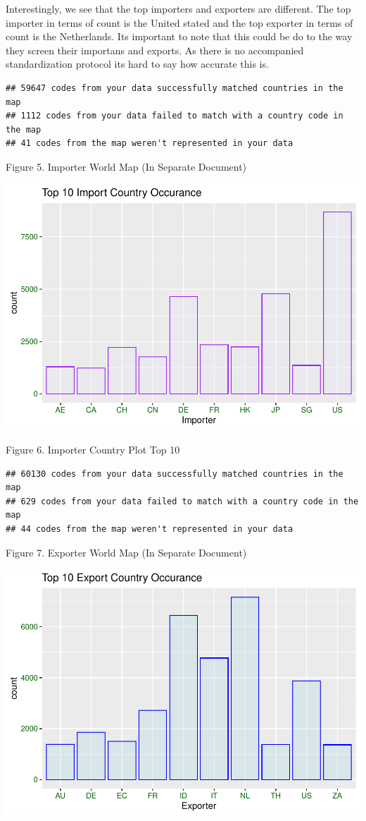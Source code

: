 \documentclass[
  12pt,
]{article}
\begin{document}
Interestingly, we see that the top importers and exporters are
different. The top importer in terms of count is the United stated and
the top exporter in terms of count is the Netherlands. Its important to
note that this could be do to the way they screen their importans and
exports. As there is no accompanied standardization protocol its hard to
say how accurate this is.

\begin{verbatim}
## 59647 codes from your data successfully matched countries in the map
## 1112 codes from your data failed to match with a country code in the map
## 41 codes from the map weren't represented in your data
\end{verbatim}

Figure 5. Importer World Map (In Separate Document)

\includegraphics{Wood_ENV872_Project_files/figure-latex/unnamed-chunk-10-1.pdf}

Figure 6. Importer Country Plot Top 10

\begin{verbatim}
## 60130 codes from your data successfully matched countries in the map
## 629 codes from your data failed to match with a country code in the map
## 44 codes from the map weren't represented in your data
\end{verbatim}

Figure 7. Exporter World Map (In Separate Document)

\includegraphics{Wood_ENV872_Project_files/figure-latex/unnamed-chunk-12-1.pdf}
\end{document}

